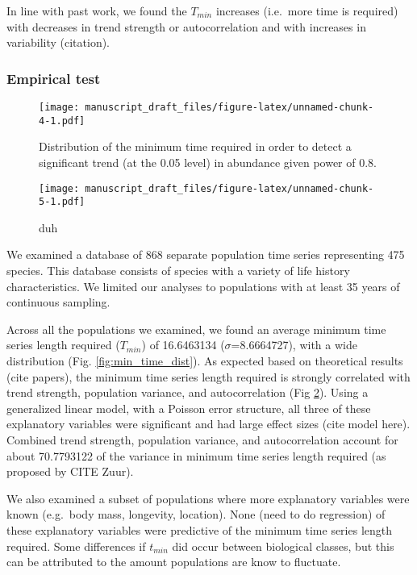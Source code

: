 \documentclass[11pt,]{article}
\begin{document}
In line with past work, we found the \(T_{min}\) increases (i.e.~more
time is required) with decreases in trend strength or autocorrelation
and with increases in variability (citation).

\subsubsection{Empirical test}\label{empirical-test}

\begin{figure}[htbp]
\centering
\texttt{[image: manuscript\_draft\_files/figure-latex/unnamed-chunk-4-1.pdf]}
\caption{Distribution of the minimum time required in order to detect a
significant trend (at the 0.05 level) in abundance given power of
0.8.\label{fig:fig:min_time_dist}}
\end{figure}

\begin{figure}[htbp]
\centering
\texttt{[image: manuscript\_draft\_files/figure-latex/unnamed-chunk-5-1.pdf]}
\caption{duh\label{fig:correlates}}
\end{figure}

We examined a database of 868 separate population time series
representing 475 species. This database consists of species with a
variety of life history characteristics. We limited our analyses to
populations with at least 35 years of continuous sampling.

Across all the populations we examined, we found an average minimum time
series length required (\(T_{min}\)) of 16.6463134
(\(\sigma\)=8.6664727), with a wide distribution (Fig.
\ref{fig:min_time_dist}). As expected based on theoretical results (cite
papers), the minimum time series length required is strongly correlated
with trend strength, population variance, and autocorrelation (Fig
\ref{fig:correlates}). Using a generalized linear model, with a Poisson
error structure, all three of these explanatory variables were
significant and had large effect sizes (cite model here). Combined trend
strength, population variance, and autocorrelation account for about
70.7793122 of the variance in minimum time series length required (as
proposed by CITE Zuur).

We also examined a subset of populations where more explanatory
variables were known (e.g.~body mass, longevity, location). None (need
to do regression) of these explanatory variables were predictive of the
minimum time series length required. Some differences if \(t_{min}\) did
occur between biological classes, but this can be attributed to the
amount populations are know to fluctuate.
\end{document}
